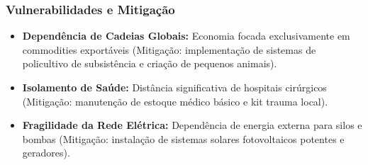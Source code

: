 \subsubsection{Vulnerabilidades e
Mitigação}

\begin{itemize}
\tightlist
\item
  \textbf{Dependência de Cadeias Globais:} Economia focada
  exclusivamente em commodities exportáveis (Mitigação: implementação de
  sistemas de policultivo de subsistência e criação de pequenos
  animais).
\item
  \textbf{Isolamento de Saúde:} Distância significativa de hospitais
  cirúrgicos (Mitigação: manutenção de estoque médico básico e kit
  trauma local).
\item
  \textbf{Fragilidade da Rede Elétrica:} Dependência de energia externa
  para silos e bombas (Mitigação: instalação de sistemas solares
  fotovoltaicos potentes e geradores).
\end{itemize}

